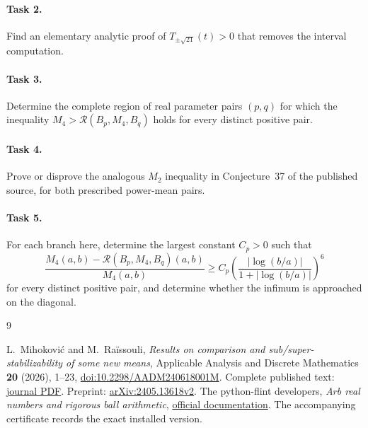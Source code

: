 \documentclass[11pt]{article}
\newcommand{\R}{\mathcal R}
\begin{document}
\paragraph{Task 2.}
Find an elementary analytic proof of \(T_{\pm\sqrt{21}}(t)>0\)
that removes the interval computation.
\paragraph{Task 3.}
Determine the complete region of real parameter pairs \((p,q)\) for
which the inequality
\(M_4>\R(B_p,M_4,B_q)\) holds for every distinct positive pair.
\paragraph{Task 4.}
Prove or disprove the analogous \(M_2\) inequality in Conjecture~37
of the published source, for both prescribed power-mean pairs.
\paragraph{Task 5.}
For each branch here, determine the largest constant \(C_p>0\) such that
\[
 \frac{M_4(a,b)-\R(B_p,M_4,B_q)(a,b)}{M_4(a,b)}
 \ge C_p\left(\frac{|\log(b/a)|}{1+|\log(b/a)|}\right)^6
\]
for every distinct positive pair, and determine whether the infimum
is approached on the diagonal.

\begin{thebibliography}{9}
\raggedright
{}
L.~Mihokovi\'c and M.~Ra\"issouli,
\emph{Results on comparison and sub/super-stabilizability of some new means},
Applicable Analysis and Discrete Mathematics \textbf{20} (2026), 1--23,
\href{https://doi.org/10.2298/AADM240618001M}{doi:10.2298/AADM240618001M}.
Complete published text:
\href{http://pefmath.etf.rs/vol20num1/AADM-Vol20-No1-1-23.pdf}{journal PDF}.
Preprint: \href{https://arxiv.org/abs/2405.13618}{arXiv:2405.13618v2}.
The python-flint developers,
\emph{Arb real numbers and rigorous ball arithmetic},
\href{https://python-flint.readthedocs.io/en/latest/arb.html}{official documentation}.
The accompanying certificate records the exact installed version.
\end{thebibliography}
\end{document}
